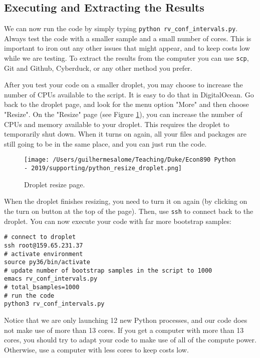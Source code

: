 \documentclass[12pt, a4paper]{article}
\begin{document}
\subsection{Executing and Extracting the Results}
\label{sec:org547b366}
We can now run the code by simply typing \texttt{python rv\_conf\_intervals.py}.
Always test the code with a smaller sample and a small number of cores.
This is important to iron out any other issues that might appear, and to keep costs low while we are testing.
To extract the results from the computer you can use \texttt{scp}, Git and Github, Cyberduck, or any other method you prefer.

After you test your code on a smaller droplet, you may choose to increase the number of CPUs available to the script.
It is easy to do that in DigitalOcean.
Go back to the droplet page, and look for the menu option "More" and then choose "Resize".
On the "Resize" page (see Figure \ref{fig:orgc5e064e}), you can increase the number of CPUs and memory available to your droplet.
This requires the droplet to temporarily shut down.
When it turns on again, all your files and packages are still going to be in the same place, and you can just run the code.

\begin{figure}[H]
\centering
\texttt{[image: /Users/guilhermesalome/Teaching/Duke/Econ890 Python - 2019/supporting/python\_resize\_droplet.png]}
\caption{\label{fig:orgc5e064e}
Droplet resize page.}
\end{figure}

When the droplet finishes resizing, you need to turn it on again (by clicking on the turn on button at the top of the page).
Then, use \texttt{ssh} to connect back to the droplet.
You can now execute your code with far more bootstrap samples:
\lstset{language=bash,label= ,caption= ,captionpos=b,firstnumber=1,numbers=left,style=bash}
\begin{lstlisting}
# connect to droplet
ssh root@159.65.231.37
# activate environment
source py36/bin/activate
# update number of bootstrap samples in the script to 1000
emacs rv_conf_intervals.py
# total_bsamples=1000
# run the code
python3 rv_conf_intervals.py
\end{lstlisting}
Notice that we are only launching 12 new Python processes, and our code does not make use of more than 13 cores.
If you get a computer with more than 13 cores, you should try to adapt your code to make use of all of the compute power.
Otherwise, use a computer with less cores to keep costs low.
\end{document}
